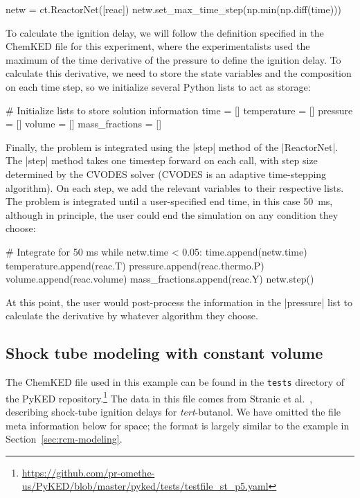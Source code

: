 \documentclass[12pt]{ijck}
\newcommand\ck{ChemKED}
\newcommand\pk{PyKED}
\begin{document}
\begin{pythonbox}
netw = ct.ReactorNet([reac])
netw.set_max_time_step(np.min(np.diff(time)))
\end{pythonbox}

To calculate the ignition delay, we will follow the definition specified in the ChemKED file for
this experiment, where the experimentalists used the maximum of the time derivative of the pressure
to define the ignition delay. To calculate this derivative, we need to store the state variables and the composition on each time step, so we initialize several Python lists to act as storage:

\begin{pythonbox}
# Initialize lists to store solution information
time = []
temperature = []
pressure = []
volume = []
mass_fractions = []
\end{pythonbox}

Finally, the problem is integrated using the \pybox|step| method of the \pybox|ReactorNet|. The
\pybox|step| method takes one timestep forward on each call, with step size determined by the CVODES
solver (CVODES is an adaptive time-stepping algorithm). On each step, we add the relevant variables
to their respective lists. The problem is integrated until a user-specified end time, in this case
\SI{50}{\milli\second}, although in principle, the user could end the simulation on any condition
they choose:

\begin{pythonbox}
# Integrate for 50 ms
while netw.time < 0.05:
    time.append(netw.time)
    temperature.append(reac.T)
    pressure.append(reac.thermo.P)
    volume.append(reac.volume)
    mass_fractions.append(reac.Y)
    netw.step()
\end{pythonbox}

At this point, the user would post-process the information in the \pybox|pressure| list to calculate
the derivative by whatever algorithm they choose.

\subsection{Shock tube modeling with constant volume}
\label{sec:shock-tube}

The \ck{} file used in this example can be found in the \texttt{tests} directory of the \pk{}
repository.\footnote{\url{https://github.com/pr-omethe-us/PyKED/blob/master/pyked/tests/testfile_st_p5.yaml}}
The data in this file comes from Stranic et al.~\autocite{Stranic:2012}, describing
shock-tube ignition delays for \textit{tert}-butanol. We have omitted the file
meta information below for space; the format is largely similar to the example in
Section~\ref{sec:rcm-modeling}.
\end{document}

